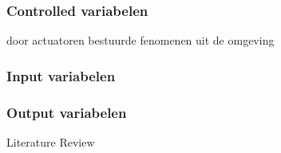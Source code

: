 \subsubsection{Controlled variabelen}
door actuatoren bestuurde fenomenen uit de omgeving
\subsubsection{Input variabelen}
\subsubsection{Output variabelen}






\begin{frame}{Literature Review}
	\begin{table}[htbp]
		\footnotesize
		

\end{table}
\end{frame}
